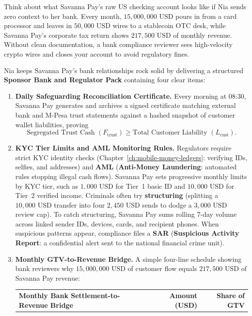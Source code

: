 Think about what Savanna Pay's raw US checking account looks like if Nia sends zero context to her bank. Every month, $15{,}000{,}000\text{ USD}$ pours in from a card processor and leaves in $50{,}000\text{ USD}$ wires to a stablecoin OTC desk, while Savanna Pay's corporate tax return shows $217{,}500\text{ USD}$ of monthly revenue. Without clean documentation, a bank compliance reviewer sees high-velocity crypto wires and closes your account to avoid regulatory fines.

Nia keeps Savanna Pay's bank relationships rock solid by delivering a structured \textbf{Sponsor Bank and Regulator Pack} containing four clear items:

\begin{enumerate}
  \item \textbf{Daily Safeguarding Reconciliation Certificate.} Every morning at 08:30, Savanna Pay generates and archives a signed certificate matching external bank and M-Pesa trust statements against a hashed snapshot of customer wallet liabilities, proving
  \[
    \text{Segregated Trust Cash } (F_{\text{trust}}) \ge \text{Total Customer Liability } (L_{\text{cust}}).
  \]
  \item \textbf{KYC Tier Limits and AML Monitoring Rules.} Regulators require strict KYC identity checks (Chapter~\ref{ch:mobile-money-ledgers}: verifying IDs, selfies, and addresses) and \textbf{AML} (\textbf{Anti-Money Laundering}: automated rules stopping illegal cash flows). Savanna Pay sets progressive monthly limits by KYC tier, such as $1{,}000\text{ USD}$ for Tier~1 basic ID and $10{,}000\text{ USD}$ for Tier~2 verified income. Criminals often try \textbf{structuring} (splitting a $10{,}000\text{ USD}$ transfer into four $2{,}450\text{ USD}$ sends to dodge a $3{,}000\text{ USD}$ review cap). To catch structuring, Savanna Pay sums rolling 7-day volume across linked sender IDs, devices, cards, and recipient phones. When suspicious patterns appear, compliance files a \textbf{SAR} (\textbf{Suspicious Activity Report}: a confidential alert sent to the national financial crime unit).
  \item \textbf{Monthly GTV-to-Revenue Bridge.} A simple four-line schedule showing bank reviewers why $15{,}000{,}000\text{ USD}$ of customer flow equals $217{,}500\text{ USD}$ of Savanna Pay revenue:
  \begin{center}
  \small
  \begin{tabular}{lrr}
  \toprule
  \textbf{Monthly Bank Settlement-to-Revenue Bridge} & \textbf{Amount (USD)} & \textbf{Share of GTV} \\

\end{tabular}
\end{center}
\end{enumerate}
